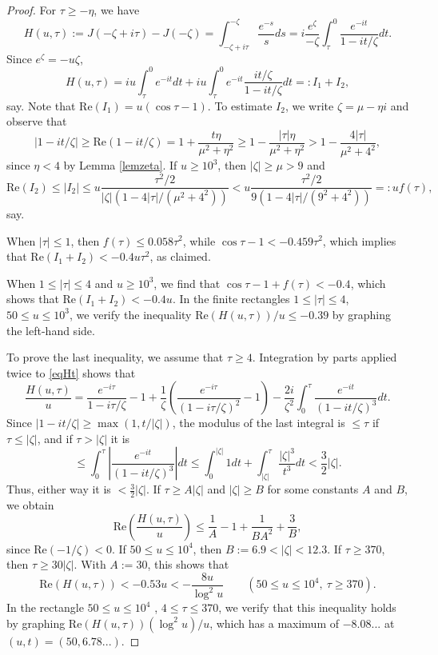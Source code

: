 \documentclass[10pt,a4paper]{amsart}
\begin{document}
\begin{proof}
For $\tau \ge -\eta$, we have
\begin{equation}\label{eqHt}
H(u,\tau):=J(-\zeta+i\tau)-J(-\zeta)=\int_{-\zeta+i\tau}^{-\zeta} \frac{e^{-s}}{s} ds = i \frac{e^\zeta}{-\zeta} \int_\tau^0 \frac{e^{-it}}{1-it/\zeta} dt.
\end{equation}
Since $e^\zeta=-u\zeta$,
$$
H(u,\tau)= iu \int_\tau^0 e^{-it} dt + iu  \int_\tau^0 e^{-it} \frac{it/\zeta}{1-it/\zeta} dt =: I_1 + I_2,
$$
say. Note that
$
\mathrm{Re}(I_1) = u(\cos \tau -1).
$
To estimate $I_2$, we write $\zeta=\mu-\eta i$ and observe that 
$$
|1-it/\zeta| \ge \mathrm{Re}(1-it/\zeta) = 1+ \frac{t\eta}{\mu^2+\eta^2}\ge  1- \frac{|\tau|\eta}{\mu^2+\eta^2}
> 1- \frac{4|\tau|}{\mu^2+4^2},
$$
since $\eta<4$ by Lemma \ref{lemzeta}. 
If $u\ge 10^3$, then  $|\zeta|\ge \mu >9$ and
$$
\mathrm{Re}(I_2)\le |I_2| \le u \frac{\tau^2/2}{|\zeta|(1-4|\tau|/(\mu^2+4^2))}<u \frac{\tau^2/2}{9(1-4|\tau|/(9^2+4^2))} =: u  f(\tau),
$$
say.

When $|\tau|\le 1$, then $f(\tau)\le 0.058 \tau^2$, while $\cos \tau -1 < -0.459\tau^2$,
which implies that $\mathrm{Re}(I_1+I_2)< -0.4 u \tau^2$, as claimed.

When $1\le |\tau| \le 4$ and $u\ge 10^3$, 
we find that $\cos \tau -1 + f(\tau) < -0.4$, which shows that $\mathrm{Re}(I_1+I_2)< -0.4 u$.
In the finite rectangles $1\le |\tau| \le 4$, $50\le u \le 10^3$, we verify the inequality
$\mathrm{Re}(H(u,\tau))/u \le -0.39$ by graphing the left-hand side. 

To prove the last inequality, we assume that $\tau \ge 4$. Integration by parts applied twice to \eqref{eqHt} shows that 
$$
\frac{H(u,\tau)}{u}=\frac{e^{-i\tau}}{1-i\tau/\zeta} -1 +\frac{1}{\zeta}\left(\frac{e^{-i\tau}}{(1-i\tau/\zeta)^2} -1 \right)
-\frac{2i}{\zeta^2}\int_0^\tau \frac{e^{-it}}{(1-it/\zeta)^3}dt.
$$
Since $|1-it/\zeta|\ge \max(1,t/|\zeta|)$, the modulus of the last integral is $\le \tau$ if $\tau \le |\zeta|$, and if $\tau > |\zeta|$ it is
$$
\le \int_0^\tau \left|\frac{e^{-it}}{(1-it/\zeta)^3}\right|dt \le \int_0^{|\zeta|} 1 dt + \int_{|\zeta|}^\tau \frac{|\zeta|^3}{t^3} dt< \frac{3}{2}|\zeta|.
$$
Thus, either way it is $< \frac{3}{2}|\zeta|$.
If $\tau\ge A|\zeta|$ and $|\zeta|\ge B$ for some constants $A$ and $B$, we obtain
$$
\mathrm{Re}\left( \frac{H(u,\tau)}{u}\right) \le  \frac{1}{A} -1 +\frac{1}{BA^2}+\frac{3}{B},
$$
since $\mathrm{Re}(-1/\zeta) <0$.
If $50\le u \le 10^4$, then $B:=6.9<|\zeta| < 12.3$. If $\tau \ge 370$, then $\tau \ge 30 |\zeta|$. 
With $A:=30$, this shows that 
$$
\mathrm{Re}(H(u,\tau)) < -0.53 u <-\frac{8u}{\log^2 u} \qquad (50\le u \le 10^4, \ \tau \ge 370).
$$
In the rectangle $50\le u \le 10^4$ , $4\le \tau \le 370$, we verify that this inequality holds by graphing 
$\mathrm{Re}(H(u,\tau)) (\log^2 u)/u$, which has a maximum of $-8.08...$ at $(u,t)=(50,6.78...)$. 


\end{proof}
\end{document}
